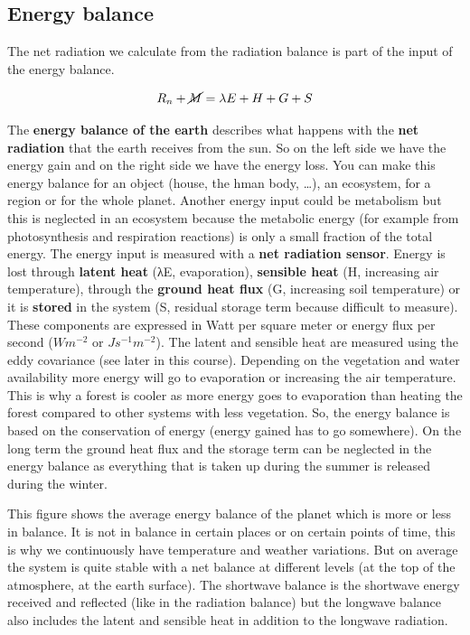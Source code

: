 \documentclass[12pt,oneside]{book}
\begin{document}
\subsection{Energy balance}\label{energy-balance-1}

The net radiation we calculate from the radiation balance is part of the
input of the energy balance.

\begin{equation} 
  R_n + \cancel{M} = \lambda E + H + G + S
  \label{eq:EqEnergyBalance}
\end{equation}

The \textbf{energy balance of the earth} describes what happens with the
\textbf{net radiation} that the earth receives from the sun. So on the
left side we have the energy gain and on the right side we have the
energy loss. You can make this energy balance for an object (house, the
hman body, \ldots{}), an ecosystem, for a region or for the whole
planet. Another energy input could be metabolism but this is neglected
in an ecosystem because the metabolic energy (for example from
photosynthesis and respiration reactions) is only a small fraction of
the total energy. The energy input is measured with a \textbf{net
radiation sensor}. Energy is lost through \textbf{latent heat} (λE,
evaporation), \textbf{sensible heat} (H, increasing air temperature),
through the \textbf{ground heat flux} (G, increasing soil temperature)
or it is \textbf{stored} in the system (S, residual storage term because
difficult to measure). These components are expressed in Watt per square
meter or energy flux per second (\(W m^{-2}\) or \(J s^{-1} m^{-2}\)).
The latent and sensible heat are measured using the eddy covariance (see
later in this course). Depending on the vegetation and water
availability more energy will go to evaporation or increasing the air
temperature. This is why a forest is cooler as more energy goes to
evaporation than heating the forest compared to other systems with less
vegetation. So, the energy balance is based on the conservation of
energy (energy gained has to go somewhere). On the long term the ground
heat flux and the storage term can be neglected in the energy balance as
everything that is taken up during the summer is released during the
winter.

This figure shows the average energy balance of the planet which is more
or less in balance. It is not in balance in certain places or on certain
points of time, this is why we continuously have temperature and weather
variations. But on average the system is quite stable with a net balance
at different levels (at the top of the atmosphere, at the earth
surface). The shortwave balance is the shortwave energy received and
reflected (like in the radiation balance) but the longwave balance also
includes the latent and sensible heat in addition to the longwave
radiation.
\end{document}
